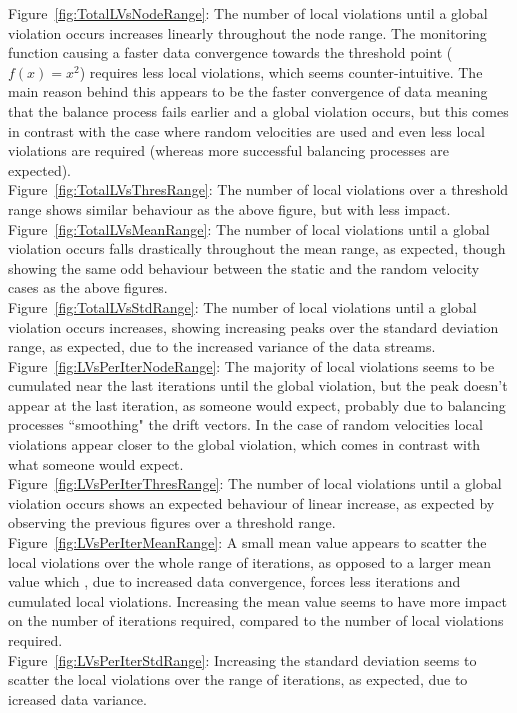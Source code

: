 \documentclass{article}
\begin{document}
			Figure~\ref{fig:TotalLVsNodeRange}: The number of local violations until a global violation occurs increases linearly throughout the node range. The monitoring function causing a faster data convergence towards the threshold point ($f(x)=x^2$) requires less local violations, which seems counter-intuitive. The main reason behind this appears to be the faster convergence of data meaning that the balance process fails earlier and a global violation occurs, but this comes in contrast with the case where random velocities are used and even less local violations are required (whereas more successful balancing processes are expected).\\
			Figure~\ref{fig:TotalLVsThresRange}: The number of local violations over a threshold range shows similar behaviour as the above figure, but with less impact.\\
			Figure~\ref{fig:TotalLVsMeanRange}: The number of local violations until a global violation occurs falls drastically throughout the mean range, as expected, though showing the same odd behaviour between the static and the random velocity cases as the above figures.\\
			Figure~\ref{fig:TotalLVsStdRange}: The number of local violations until a global violation occurs increases, showing increasing peaks over the standard deviation range, as expected, due to the increased variance of the data streams.\\
			Figure~\ref{fig:LVsPerIterNodeRange}: The majority of local violations seems to be cumulated near the last iterations until the global violation, but the peak doesn't appear at the last iteration, as someone would expect, probably due to balancing processes ``smoothing" the drift vectors. In the case of random velocities local violations appear closer to the global violation, which comes in contrast with what someone would expect.\\
			Figure~\ref{fig:LVsPerIterThresRange}: The number of local violations until a global violation occurs shows an expected behaviour of linear increase, as expected by observing the previous figures over a threshold range.\\
			Figure~\ref{fig:LVsPerIterMeanRange}: A small mean value appears to scatter the local violations over the whole range of iterations, as opposed to a larger mean value which , due to increased data convergence, forces less iterations and cumulated local violations. Increasing the mean value seems to have more impact on the number of iterations required, compared to the number of local violations required.\\
			Figure~\ref{fig:LVsPerIterStdRange}: Increasing the standard deviation seems to scatter the local violations over the range of iterations, as expected, due to icreased data variance.
			
\end{document}
